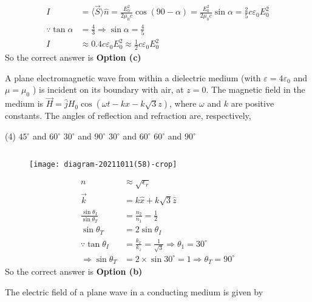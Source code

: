 \begin{enumerate}
\begin{answer}
\begin{align*}
		I&=\langle\vec{S}\rangle \hat{n}=\frac{E_{0}^{2}}{2 \mu_{0} c} \cos (90-\alpha)=\frac{E_{0}^{2}}{2 \mu_{0} c} \sin \alpha=\frac{2}{5} c \varepsilon_{0} E_{0}^{2}\\
		\because \tan \alpha&=\frac{4}{3} \Rightarrow \sin \alpha=\frac{4}{5}\\
		I &\approx 0.4 c \varepsilon_{0} E_{0}^{2} \approx \frac{1}{2} c \varepsilon_{0} E_{0}^{2}
		\end{align*}
		So the correct answer is \textbf{Option (c)}
	\end{answer}
	\begin{minipage}{\textwidth}
		\item A plane electromagnetic wave from within a dielectric medium (with $\varepsilon=4 \varepsilon_{0}$ and $\mu=\mu_{0}$ ) is incident on its boundary with air, at $z=0$. The magnetic field in the medium is $\vec{H}=\hat{j} H_{0} \cos (\omega t-k x-k \sqrt{3} z)$, where $\omega$ and $k$ are positive constants.
		The angles of reflection and refraction are, respectively,
	\end{minipage}
	\begin{tasks}(4)
		\task[\textbf{a.}] $45^{\circ}$ and $60^{\circ}$
		\task[\textbf{b.}]$30^{\circ}$ and $90^{\circ}$
		\task[\textbf{c.}]$30^{\circ}$ and $60^{\circ}$
		\task[\textbf{d.}]$60^{\circ}$ and $90^{\circ}$
	\end{tasks}
	\begin{answer}$\left. \right. $
		\begin{figure}[H]
			\centering
			\texttt{[image: diagram-20211011(58)-crop]}
		\end{figure}
		\begin{align*}
		n &\approx \sqrt{\epsilon_{r}}\\
		\vec{k}&=k \hat{x}+k \sqrt{3} \hat{z}\\
		\frac{\sin \theta_{I}}{\sin \theta_{T}}&=\frac{n_{2}}{n_{1}}=\frac{1}{2}\\
		\sin \theta_{T}&=2 \sin \theta_{I}\\ \because \tan \theta_{I}&=\frac{k_{x}}{k_{z}}=\frac{1}{\sqrt{3}} \Rightarrow \theta_{1}=30^{\circ}\\
		\Rightarrow \sin \theta_{T}&=2 \times \sin 30^{\circ}=1 \Rightarrow \theta_{T}=90^{\circ}
		\end{align*}
		So the correct answer is \textbf{Option (b)}
	\end{answer}
	\begin{minipage}{\textwidth}
		\item The electric field of a plane wave in a conducting medium is given by

\end{minipage}
\end{enumerate}
